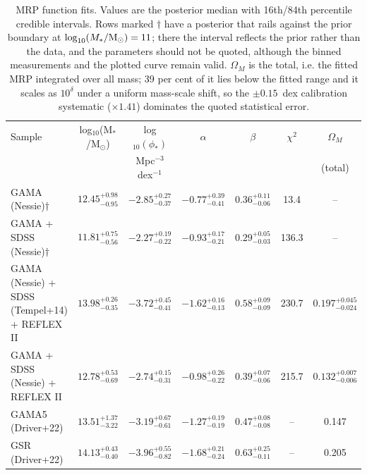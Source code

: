 \begin{table}
\centering
\caption{MRP function fits.  Values are the posterior median with 16th/84th percentile credible intervals.  Rows marked $\dagger$ have a posterior that rails against the prior boundary at $\log_{10}(M_*/{\rm M}_\odot) = 11$; there the interval reflects the prior rather than the data, and the parameters should not be quoted, although the binned measurements and the plotted curve remain valid.  $\Omega_M$ is the total, i.e. the fitted MRP integrated over all mass; 39 per cent of it lies below the fitted range and it scales as $10^{\delta}$ under a uniform mass-scale shift, so the $\pm0.15$~dex calibration systematic ($\times1.41$) dominates the quoted statistical error.}
\begin{tabular}{lcccccc}
\hline
Sample & log$_{10}$(M$_*$/M$_\odot$) & log$_{10}(\phi_*)$ & $\alpha$ & $\beta$ & $\chi^2$ & $\Omega_M$ \\
 & & Mpc$^{-3}$ dex$^{-1}$ & & & & (total) \\
\hline
GAMA (Nessie)$\dagger$ & $12.45^{+0.98}_{-0.95}$ & $-2.85^{+0.27}_{-0.37}$ & $-0.77^{+0.39}_{-0.41}$ & $0.36^{+0.11}_{-0.06}$ & 13.4 & -- \\
GAMA + SDSS (Nessie)$\dagger$ & $11.81^{+0.75}_{-0.56}$ & $-2.27^{+0.19}_{-0.22}$ & $-0.93^{+0.17}_{-0.21}$ & $0.29^{+0.05}_{-0.03}$ & 136.3 & -- \\
GAMA (Nessie) + SDSS (Tempel+14) + REFLEX II & $13.98^{+0.26}_{-0.35}$ & $-3.72^{+0.45}_{-0.41}$ & $-1.62^{+0.16}_{-0.13}$ & $0.58^{+0.09}_{-0.09}$ & 230.7 & $0.197^{+0.045}_{-0.024}$ \\
GAMA + SDSS (Nessie) + REFLEX II & $12.78^{+0.53}_{-0.69}$ & $-2.74^{+0.15}_{-0.31}$ & $-0.98^{+0.26}_{-0.22}$ & $0.39^{+0.07}_{-0.06}$ & 215.7 & $0.132^{+0.007}_{-0.006}$ \\
\hline
GAMA5 (Driver+22) & $13.51^{+1.37}_{-3.22}$ & $-3.19^{+0.67}_{-0.61}$ & $-1.27^{+0.19}_{-0.19}$ & $0.47^{+0.08}_{-0.08}$ & -- & 0.147 \\
GSR (Driver+22) & $14.13^{+0.43}_{-0.40}$ & $-3.96^{+0.55}_{-0.82}$ & $-1.68^{+0.21}_{-0.24}$ & $0.63^{+0.25}_{-0.11}$ & -- & 0.205 \\
\hline
\end{tabular}
\label{tab:mrp}
\end{table}
